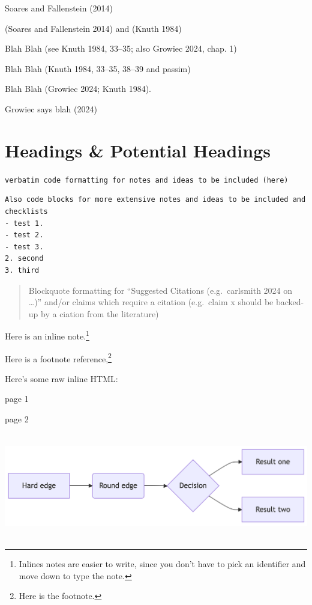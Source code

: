 \documentclass[
  letterpaper,
]{book}
\begin{document}

Soares and Fallenstein (2014)

(Soares and Fallenstein 2014) and (Knuth 1984)

Blah Blah (see Knuth 1984, 33--35; also Growiec 2024, chap. 1)

Blah Blah (Knuth 1984, 33--35, 38--39 and passim)

Blah Blah (Growiec 2024; Knuth 1984).

Growiec says blah (2024)

\section{Headings \& Potential Headings}\label{sec-heading}

\texttt{verbatim\ code\ formatting\ for\ notes\ and\ ideas\ to\ be\ included\ (here)}

\begin{verbatim}
Also code blocks for more extensive notes and ideas to be included and checklists
- test 1. 
- test 2. 
- test 3.
2. second
3. third
\end{verbatim}

\begin{quote}
Blockquote formatting for ``Suggested Citations (e.g.~carlsmith 2024 on
\ldots)'' and/or claims which require a citation (e.g.~claim x should be
backed-up by a ciation from the literature)
\end{quote}

Here is an inline note.\footnote{Inlines notes are easier to write,
  since you don't have to pick an identifier and move down to type the
  note.}

Here is a footnote reference,\footnote{Here is the footnote.}

\renewcommand*{\labelitemi}{\textgreater}

Here's some raw inline HTML:

page 1

\newpage{}

page 2

\includegraphics[width=6.88in,height=1.81in]{ref/references_files/figure-latex/mermaid-figure-2.png}
\end{document}
